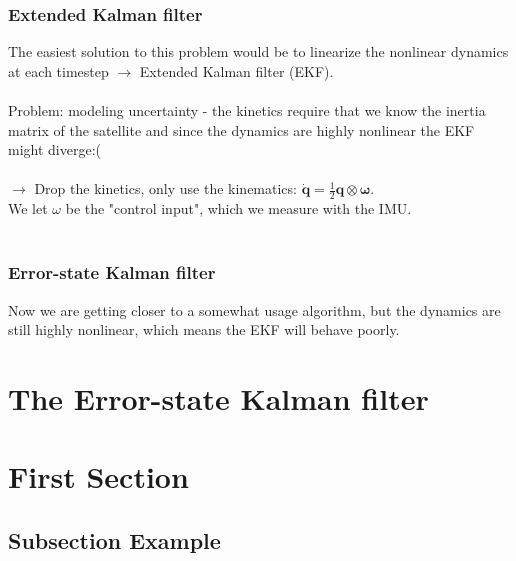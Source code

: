 \documentclass{beamer}
\begin{document}

\begin{frame}
    \frametitle{Extended Kalman filter}
    The easiest solution to this problem would be to linearize the nonlinear dynamics at each timestep $\rightarrow$ Extended Kalman filter (EKF). \\~\\

    Problem: modeling uncertainty - the kinetics require that we know the inertia matrix of the satellite and since the dynamics are highly nonlinear the EKF might diverge:( \\~\\

    $\rightarrow$ Drop the kinetics, only use the kinematics: $\dot{\mathbf{q}}=\frac{1}{2} \mathbf{q} \otimes \boldsymbol{\omega}$. \\
    We let $\omega$ be the "control input", which we measure with the IMU. \\~\\
\end{frame}

\begin{frame}
    \frametitle{Error-state Kalman filter}
    Now we are getting closer to a somewhat usage algorithm, but the dynamics are still highly nonlinear, which means the EKF will behave poorly.
\end{frame}


\section{The Error-state Kalman filter}

\section{First Section} %

\subsection{Subsection Example} %
\end{document}
